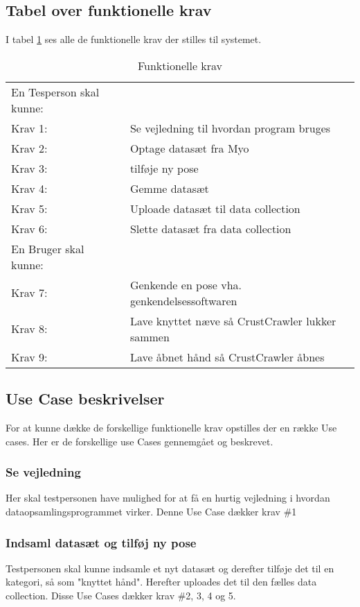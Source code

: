 \subsection*{Tabel over funktionelle krav}
I tabel \ref{tab:funktionellekrav} ses alle de funktionelle krav der stilles til systemet.
\bgroup
\def\arraystretch{1.8}
\begin{center}
	\begin{table}
		\begin{tabular}{lp{225pt}}
			\rowcolor{grey} En Tesperson skal kunne: &\\
			Krav 1:& Se vejledning til hvordan program bruges\\
			Krav 2:& Optage datasæt fra Myo\\
			Krav 3:& tilføje ny pose\\
			Krav 4:& Gemme datasæt\\
			Krav 5:& Uploade datasæt til data collection\\
			Krav 6:& Slette datasæt fra data collection\\
			\rowcolor{grey}En Bruger skal kunne: &\\
			Krav 7:& Genkende en pose vha. genkendelsessoftwaren\\
			Krav 8:& Lave knyttet næve så CrustCrawler lukker sammen\\
			Krav 9:& Lave åbnet hånd så CrustCrawler åbnes
		\end{tabular}
		\caption{Funktionelle krav}
		\label{tab:funktionellekrav}
	\end{table}	
\end{center}
\egroup

\subsection*{Use Case beskrivelser}
For at kunne dække de forskellige funktionelle krav opstilles der en række Use cases. Her er de forskellige use Cases gennemgået og beskrevet.

\subsubsection{Se vejledning}
Her skal testpersonen have mulighed for at få en hurtig vejledning i hvordan dataopsamlingsprogrammet virker. Denne Use Case dækker krav \#1

\subsubsection{Indsaml datasæt og tilføj ny pose}
Testpersonen skal kunne indsamle et nyt datasæt og derefter tilføje det til en kategori, så som "knyttet hånd". Herefter uploades det til den fælles data collection. Disse Use Cases dækker krav \#2, 3, 4 og 5.
